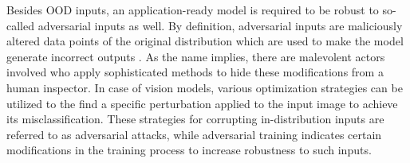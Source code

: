 Besides OOD inputs, an application-ready model is required to be robust to so-called adversarial inputs as well. By definition, adversarial inputs are 
maliciously altered data points of the original distribution which are used to make the model generate incorrect outputs \cite{adversarial_survey}.
As the name implies, there are malevolent actors involved who apply sophisticated methods to hide these modifications from a human inspector. In case of 
vision models, various optimization strategies can be utilized to the find a specific perturbation applied to the input image to achieve its misclassification.   
These strategies for corrupting in-distribution inputs are referred to as adversarial attacks, while adversarial training indicates certain modifications
in the training process to increase robustness to such inputs.


